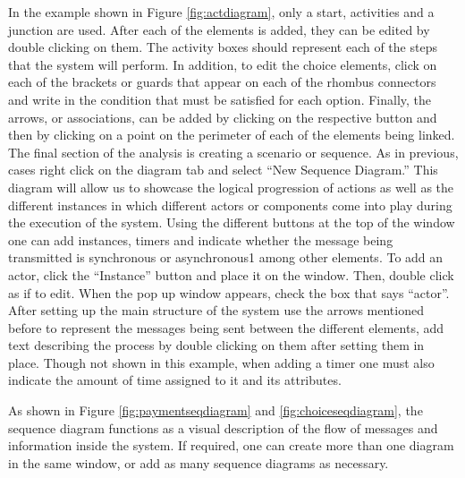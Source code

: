 \documentclass[12pt]{article}
\begin{document}
In the example shown in Figure \ref{fig:actdiagram}, only a start, activities and a junction are used.  After each of the elements is added, they can be edited by double clicking on them. The activity boxes should represent each of the steps that the system will perform. In addition, to edit the choice elements, click on each of the brackets or guards that appear on each of the rhombus connectors and write in the condition that must be satisfied for each option. Finally, the arrows, or associations, can be added by clicking on the respective button and then by clicking on a point on the perimeter of each of the elements being linked.
	The final section of the analysis is creating a scenario or sequence. As in previous, cases right click on the diagram tab and select “New Sequence Diagram.” This diagram will allow us to showcase the logical progression of actions as well as the different instances in which different actors or components come into play during the execution of the system. Using the different buttons at the top of the window one can add instances, timers and indicate whether the message being transmitted is synchronous or asynchronous1 among other elements. 
To add an actor, click the “Instance” button and place it on the window. Then, double click as if to edit. When the pop up window appears, check the box that says “actor”. After setting up the main structure of the system use the arrows mentioned before to represent the messages being sent between the different elements, add text describing the process by double clicking on them after setting them in place. Though not shown in this example, when adding a timer one must also indicate the amount of time assigned to it and its attributes.

As shown in Figure \ref{fig:paymentseqdiagram} and \ref{fig:choiceseqdiagram}, the sequence diagram functions as a visual description of the flow of messages and information inside the system. If required, one can create more than one diagram in the same window, or add as many sequence diagrams as necessary.
\end{document}
